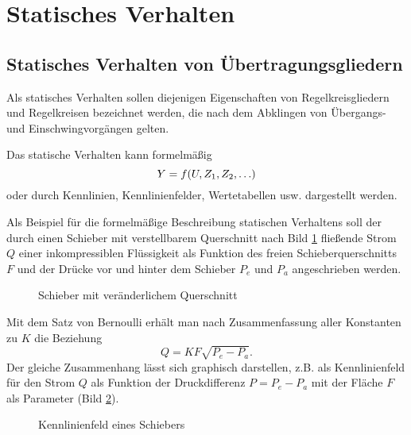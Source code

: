 \section{Statisches Verhalten}


\subsection{Statisches Verhalten von Übertragungsgliedern}

Als statisches Verhalten sollen diejenigen Eigenschaften von Regelkreisgliedern und Regelkreisen bezeichnet werden, die nach dem Abklingen von Übergangs- und Einschwingvorgängen gelten.

Das statische Verhalten kann formelmäßig
\begin{equation}\label{eq:2-1}
    Y = f\parentheses*{U, Z_1, Z_2, \ldots}
\end{equation}
oder durch Kennlinien, Kennlinienfelder, Wertetabellen usw. dargestellt werden.

Als Beispiel für die formelmäßige Beschreibung statischen Verhaltens soll der durch einen Schieber mit verstellbarem Querschnitt nach Bild \ref{fig:2-1} fließende Strom \(Q\) einer inkompressiblen Flüssigkeit als Funktion des freien Schieberquerschnitts \(F\) und der Drücke vor und hinter dem Schieber \(P_e\) und \(P_a\) angeschrieben werden.

\begin{figure}[ht]
    \centering
    \caption{Schieber mit veränderlichem Querschnitt}
    \label{fig:2-1}
\end{figure}

Mit dem Satz von Bernoulli erhält man nach Zusammenfassung aller Konstanten zu \(K\) die Beziehung
\begin{equation}
    Q = KF\sqrt{P_e - P_a}.
\end{equation}
Der gleiche Zusammenhang lässt sich graphisch darstellen, z.B. als Kennlinienfeld für den Strom \(Q\) als Funktion der Druckdifferenz \(P = P_e - P_a\) mit der Fläche \(F\) als Parameter (Bild \ref{fig:2-2}).

\begin{figure}[h]
    \centering
    \caption{Kennlinienfeld eines Schiebers}
    \label{fig:2-2}
\end{figure}


